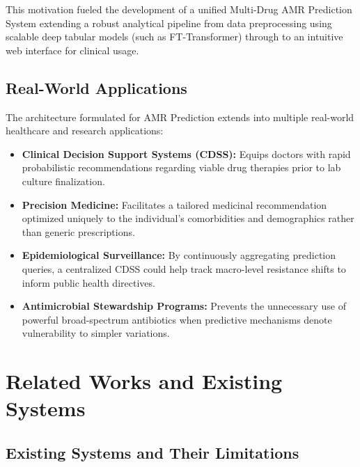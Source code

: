 \documentclass[12pt,a4paper]{report}
\begin{document}
This motivation fueled the development of a unified Multi-Drug AMR Prediction System extending a robust analytical pipeline from data preprocessing using scalable deep tabular models (such as FT-Transformer) through to an intuitive web interface for clinical usage.

\section{Real-World Applications}

The architecture formulated for AMR Prediction extends into multiple real-world healthcare and research applications:

\begin{itemize}[noitemsep, leftmargin=*]
  \item \textbf{Clinical Decision Support Systems (CDSS):} Equips doctors with rapid probabilistic recommendations regarding viable drug therapies prior to lab culture finalization.
  \item \textbf{Precision Medicine:} Facilitates a tailored medicinal recommendation optimized uniquely to the individual's comorbidities and demographics rather than generic prescriptions.
  \item \textbf{Epidemiological Surveillance:} By continuously aggregating prediction queries, a centralized CDSS could help track macro-level resistance shifts to inform public health directives.
  \item \textbf{Antimicrobial Stewardship Programs:} Prevents the unnecessary use of powerful broad-spectrum antibiotics when predictive mechanisms denote vulnerability to simpler variations.
\end{itemize}

\chapter{Related Works and Existing Systems}
\thispagestyle{fancy}

\section{Existing Systems and Their Limitations}
\end{document}
